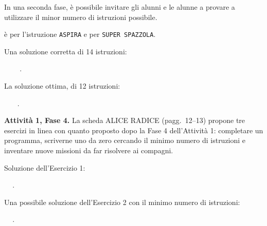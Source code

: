 \begin{rimandiquaderno}
In una seconda fase, è possibile invitare gli alunni e le alunne a provare a utilizzare il minor numero di istruzioni possibile.

\iconAspira{} è per l'istruzione \texttt{ASPIRA} e \iconMocio{} per \texttt{SUPER SPAZZOLA}.
\par\smallskip
Una soluzione corretta di 14 istruzioni:
\par\smallskip
\mbox{\iconDx\,\iconAvanti\,\iconSx\,\iconAvanti\,\iconAspira\,\iconDx\,\iconAvanti\,\iconSx\,\iconAvanti\,\iconMocio\,\iconAvanti\,\iconSx\,\iconAvanti\,\iconAspira.}
\par\smallskip
La soluzione ottima, di 12 istruzioni:
\par\smallskip
\mbox{\iconAvanti\,\iconDx\,\iconAvanti\,\iconAspira\,\iconAvanti\,\iconSx\,\iconAvanti\,\iconMocio\,\iconAvanti\,\iconSx\,\iconAvanti\,\iconAspira.}



\textbf{Attività 1, Fase 4.} La scheda ALICE RADICE (pagg.~12--13) propone tre esercizi in linea con quanto proposto dopo la Fase 4 dell'Attività 1: completare un programma, scriverne uno da zero cercando il minimo numero di istruzioni e inventare nuove missioni da far risolvere ai compagni.
\par\smallskip
Soluzione dell'Esercizio 1:
\par\smallskip
\mbox{\iconAvanti\,\iconDx\,\iconAvanti\,\iconSx\,\iconAvanti\,\iconAvanti\,\iconSx\,\iconAvanti.}
\par\smallskip
Una possibile soluzione dell'Esercizio 2 con il minimo numero di istruzioni:
\par\smallskip
\mbox{\iconAvanti\,\iconSx\,\iconAvanti\,\iconDx\,\iconAvanti\,\iconAvanti\,\iconDx\,\iconAvanti.}
\end{rimandiquaderno}
